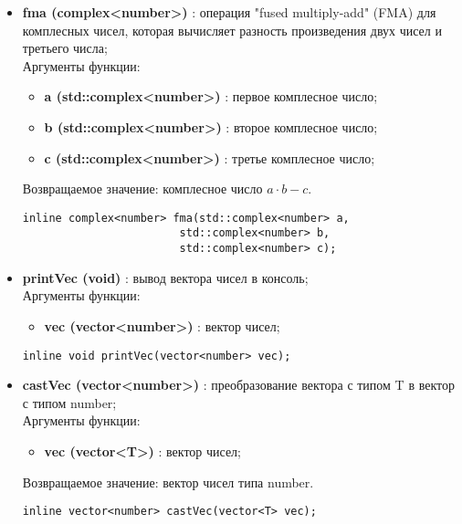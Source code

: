 \documentclass[a4paper,12pt]{article}
\begin{document}
\begin{itemize}
    \item \textbf{fma (complex<number>)} : операция "fused multiply-add" (FMA) для комплесных чисел, которая вычисляет разность произведения двух чисел и третьего числа;
    \\Аргументы функции:
    \begin{itemize}
        \renewcommand{\labelitemi}{-}
        \item \textbf{a (std::complex<number>)} : первое комплесное число;
        \item \textbf{b (std::complex<number>)} : второе комплесное число;
        \item \textbf{c (std::complex<number>)} : третье комплесное число;
    \end{itemize}
    Возвращаемое значение: комплесное число $a\cdot b - c$.
    \begin{lstlisting}[language=С++]
inline complex<number> fma(std::complex<number> a, 
                        std::complex<number> b, 
                        std::complex<number> c); \end{lstlisting}

    \item \textbf{printVec (void)} : вывод вектора чисел в консоль;
    \\Аргументы функции:
    \begin{itemize}
        \renewcommand{\labelitemi}{-}
        \item \textbf{vec (vector<number>)} : вектор чисел;
    \end{itemize}
    \begin{lstlisting}[language=С++]
inline void printVec(vector<number> vec); \end{lstlisting}

    \item \textbf{castVec (vector<number>)} : преобразование вектора с типом T в вектор с типом number;
    \\Аргументы функции:
    \begin{itemize}
        \renewcommand{\labelitemi}{-}
        \item \textbf{vec (vector<T>)} : вектор чисел;
    \end{itemize}
    Возвращаемое значение: вектор чисел типа number.
    \begin{lstlisting}[language=С++]
inline vector<number> castVec(vector<T> vec); \end{lstlisting}
\end{itemize}
\end{document}
